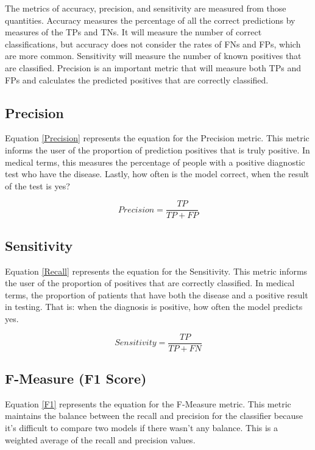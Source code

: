 \documentclass[10pt,conference,a4paper]{IEEEtran}
\begin{document}
The metrics of accuracy, precision, and sensitivity are measured from those quantities. Accuracy measures the percentage of all the correct predictions by measures of the TPs and TNs. It will measure the number of correct classifications, but accuracy does not consider the rates of FNs and FPs, which are more common. Sensitivity will measure the number of known positives that are classified. Precision is an important metric that will measure both TPs and FPs and calculates the predicted positives that are correctly classified. 

\subsection{Precision}

Equation \ref{Precision} represents the equation for the Precision metric. This metric informs the user of the proportion of prediction positives that is truly positive. In medical terms, this measures the percentage of people with a positive diagnostic test who have the disease. Lastly, how often is the model correct, when the result of the test is yes?

\begin{equation}
    Precision = \frac{TP}{TP + FP}
    \label{Precision}
\end{equation}

\subsection{Sensitivity} 

Equation \ref{Recall} represents the equation for the Sensitivity. This metric informs the user of the proportion of positives that are correctly classified. In medical terms, the proportion of patients that have both the disease and a positive result in testing. That is: when the diagnosis is positive, how often the model predicts yes.

\begin{equation}
    Sensitivity =  \frac{TP}{TP + FN}
    \label{Recall}
\end{equation}

\subsection{F-Measure (F1 Score)}

Equation \ref{F1} represents the equation for the F-Measure metric. This metric maintains the balance between the recall and precision for the classifier because it's difficult to compare two models if there wasn't any balance. This is a weighted average of the recall and precision values.
\end{document}
